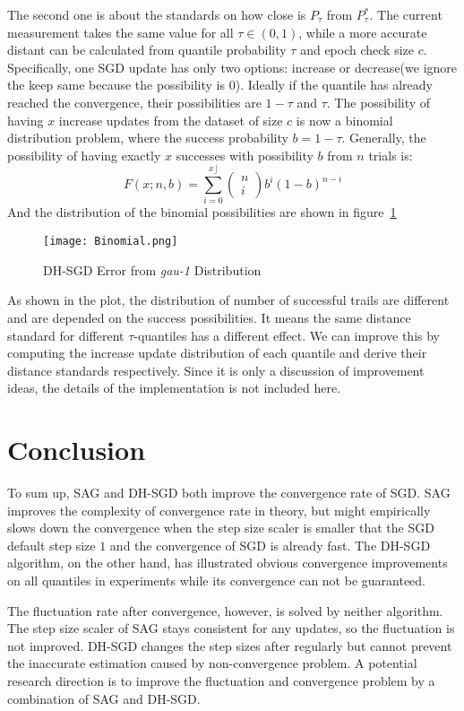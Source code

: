 The second one is about the standards on how close is $P_\tau$  from $P_\tau^*$. The current measurement takes the same value for all $\tau \in (0,1)$, while a more accurate distant can be calculated from quantile probability $\tau$ and epoch check size $c$. Specifically, one SGD update has only two options: increase or decrease(we ignore the keep same because the possibility is $0$). Ideally if the quantile has already reached the convergence, their possibilities are $1-\tau$ and $\tau$. The possibility of having $x$ increase updates from the dataset of size $c$ is now a binomial distribution problem, where the success probability $b = 1-\tau$.
Generally, the possibility of having exactly $x$ successes with possibility $b$ from $n$ trials is:
\begin{equation}
    F(x ; n,b)=\sum_{i=0}^{ x\rfloor}\left(\begin{array}{c}
    n \\
    i
\end{array}\right) b^{i}(1-b)^{n-i}
\end{equation}
And the distribution of the binomial possibilities are shown in figure~\ref{fig: binomial}
\begin{figure}[H]
    \centering
	\texttt{[image: Binomial.png]}
    \caption{DH-SGD Error from \textit{gau-1} Distribution}
    \label{fig: binomial}
\end{figure}
As shown in the plot, the distribution of number of successful trails are different and are depended on the success possibilities. It means the same distance standard for different $\tau$-quantiles has a different effect. We can improve this by computing the increase update distribution of each quantile and derive their distance standards respectively. Since it is only a discussion of improvement ideas, the details of the implementation is not included here.

\section{Conclusion}
\label{sec: stepsize_adaptation_conclusion}

To sum up, SAG and DH-SGD both improve the convergence rate of SGD. SAG improves the complexity of convergence rate in theory, but might empirically slows down the convergence when the step size scaler is smaller that the SGD default step size $1$ and the convergence of SGD is already fast. The DH-SGD algorithm, on the other hand, has illustrated obvious convergence improvements on all quantiles in experiments while its convergence can not be guaranteed.

The fluctuation rate after convergence, however, is solved by neither algorithm. The step size scaler of SAG stays consistent for any updates, so the fluctuation is not improved. DH-SGD changes the step sizes after regularly but cannot prevent the inaccurate estimation caused by non-convergence problem. A potential research direction is to improve the fluctuation and convergence problem by a combination of SAG and DH-SGD.

